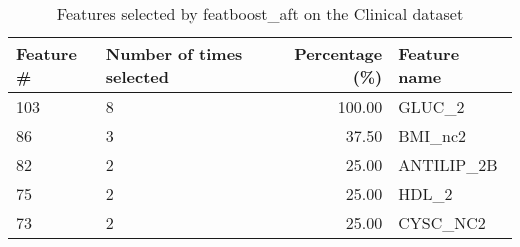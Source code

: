 \begin{table}
\caption{Features selected by featboost_aft on the Clinical dataset}
\label{tab:features_featboost_aft_clinical}
\begin{tabular}{llrl}
\toprule
Feature \# & Number of times selected & Percentage (\%) & Feature name \\
\midrule
103 & 8 & 100.00 & GLUC_2 \\
86 & 3 & 37.50 & BMI_nc2 \\
82 & 2 & 25.00 & ANTILIP_2B \\
75 & 2 & 25.00 & HDL_2 \\
73 & 2 & 25.00 & CYSC_NC2 \\
\bottomrule
\end{tabular}
\end{table}
